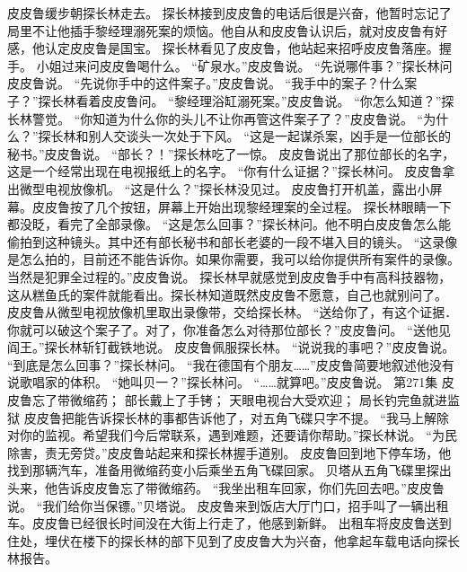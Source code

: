 \documentclass[a4paper,12pt,UTF8,twoside]{ctexbook}
\begin{document}
        皮皮鲁缓步朝探长林走去。  
        探长林接到皮皮鲁的电话后很是兴奋，他暂时忘记了局里不让他插手黎经理溺死案的烦恼。他自从和皮皮鲁认识后，就对皮皮鲁有好感，他认定皮皮鲁是国宝。        
        探长林看见了皮皮鲁，他站起来招呼皮皮鲁落座。握手。  
        小姐过来问皮皮鲁喝什么。  
        “矿泉水。”皮皮鲁说。  
        “先说哪件事？”探长林问皮皮鲁说。  
        “先说你手中的这件案子。”皮皮鲁说。  
        “我手中的案子？什么案子？”探长林看着皮皮鲁问。  
        “黎经理浴缸溺死案。”皮皮鲁说。  
        “你怎么知道？”探长林警觉。  
        “你知道为什么你的头儿不让你再管这件案子了？”皮皮鲁说。  
        “为什么？”探长林和别人交谈头一次处于下风。  
        “这是一起谋杀案，凶手是一位部长的秘书。”皮皮鲁说。  
        “部长？！”探长林吃了一惊。  
        皮皮鲁说出了那位部长的名字，这是一个经常出现在电视报纸上的名字。  
        “你有什么证据？”探长林问。  
        皮皮鲁拿出微型电视放像机。  
        “这是什么？”探长林没见过。  
        皮皮鲁打开机盖，露出小屏幕。皮皮鲁按了几个按钮，屏幕上开始出现黎经理案的全过程。  
        探长林眼睛一下都没眨，看完了全部录像。        
        “这是怎么回事？”探长林问。他不明白皮皮鲁怎么能偷拍到这种镜头。其中还有部长秘书和部长老婆的一段不堪入目的镜头。  
        “这录像是怎么拍的，目前还不能告诉你。如果你需要，我可以给你提供所有案件的录像。当然是犯罪全过程的。”皮皮鲁说。  
        探长林早就感觉到皮皮鲁手中有高科技器物，这从糕鱼氏的案件就能看出。探长林知道既然皮皮鲁不愿意，自己也就别问了。  
        皮皮鲁从微型电视放像机里取出录像带，交给探长林。  
        “送给你了，有这个证据．你就可以破这个案子了。对了，你准备怎么对待那位部长？”皮皮鲁问。  
        “送他见阎王。”探长林斩钉截铁地说。  
        皮皮鲁佩服探长林。  
        “说说我的事吧？”皮皮鲁说。  
        “到底是怎么回事？”探长林问。  
        “我在德国有个朋友……”皮皮鲁简要地叙述他没有说歌唱家的体积。  
        “她叫贝一？”探长林问。  
        “……就算吧。”皮皮鲁说。          第271集  
        皮皮鲁忘了带微缩药；  
        部长戴上了手铐；  
        天眼电视台大受欢迎；  
        局长钓完鱼就进监狱    
        皮皮鲁把能告诉探长林的事都告诉他了，对五角飞碟只字不提。  
        “我马上解除对你的监视。希望我们今后常联系，遇到难题，还要请你帮助。”探长林说。  
        “为民除害，责无旁贷。”皮皮鲁站起来和探长林握手道别。  
        皮皮鲁回到地下停车场，他找到那辆汽车，准备用微缩药变小后乘坐五角飞碟回家。  
        贝塔从五角飞碟里探出头来，他告诉皮皮鲁忘了带微缩药。  
        “我坐出租车回家，你们先回去吧。”皮皮鲁说。        
        “我们给你当保镖。”贝塔说。  
        皮皮鲁来到饭店大厅门口，招手叫了一辆出租车。皮皮鲁已经很长时间没在大街上行走了，他感到新鲜。  
        出租车将皮皮鲁送到住处，埋伏在楼下的探长林的部下见到了皮皮鲁大为兴奋，他拿起车载电话向探长林报告。  
\end{document}
